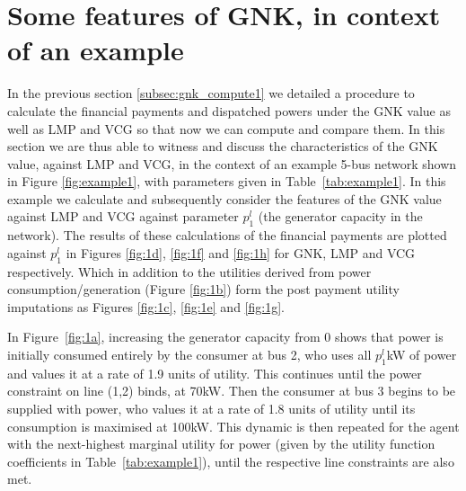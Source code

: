 \section{Some features of GNK, in context of an example}\label{sec:features}\label{sec:example_network}

In the previous section \ref{subsec:gnk_compute1} we detailed a procedure to calculate the financial payments and dispatched powers under the GNK value as well as LMP and VCG so that now we can compute and compare them.
In this section we are thus able to witness and discuss the characteristics of the GNK value, against LMP and VCG, in the context of an example 5-bus network shown in Figure \ref{fig:example1}, with parameters given in Table~\ref{tab:example1}.
In this example we calculate and subsequently consider the features of the GNK value against LMP and VCG against parameter $p_1^l$ (the generator capacity in the network).
The results of these calculations of the financial payments are plotted against $p_1^l$ in Figures \ref{fig:1d}, \ref{fig:1f} and \ref{fig:1h} for GNK, LMP and VCG respectively. Which in addition to the utilities derived from power consumption/generation (Figure \ref{fig:1b}) form the post payment utility imputations as Figures \ref{fig:1c}, \ref{fig:1e} and \ref{fig:1g}.








\iffigures
% 

\fi

In Figure~\ref{fig:1a}, increasing the generator capacity from $0$ shows that power is initially consumed entirely by the consumer at bus 2, 
who uses all $p_1^l$kW of power and values it at a rate of 1.9 units of utility. This continues until the power constraint on line (1,2) binds, at 70kW.
Then the consumer at bus 3 begins to be supplied with power, who values it at a rate of 1.8 units of utility until its consumption is maximised at 100kW. 
This dynamic is then repeated for the agent with the next-highest marginal utility for power (given by the utility function coefficients in Table~\ref{tab:example1}), until the respective line constraints are also met.

